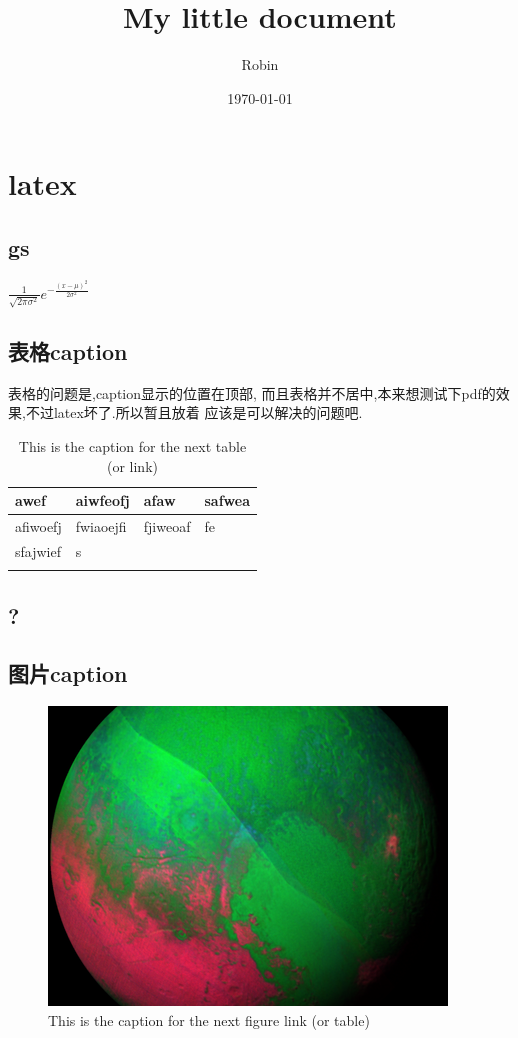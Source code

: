 \documentclass[nofonts]{ctexart}
\author{Robin}
\date{\today}
\title{My little document}
\begin{document}
\maketitle
\tableofcontents

\section{latex}
\label{sec:orgheadline10}
\subsection{gs}
\label{sec:orgheadline1}
\(\frac{1}{\sqrt{2\pi\sigma^2}}e^{ -\frac{(x-\mu)^2}{2\sigma^2} }\)
\subsection{表格caption}
\label{sec:orgheadline2}
    表格的问题是,caption显示的位置在顶部,
    而且表格并不居中,本来想测试下pdf的效果,不过latex坏了.所以暂且放着
应该是可以解决的问题吧.

\begin{table}[htb]
\caption{\label{tab:orgtable1}
This is the caption for the next table (or link)}
\centering
\begin{tabular}{llll}
awef & aiwfeofj & afaw & safwea\\
\hline
afiwoefj & fwiaoejfi & fjiweoaf & fe\\
sfajwief & s &  & \\
 &  &  & \\
\end{tabular}
\end{table}

\subsection{?}
\label{sec:orgheadline3}
\subsection{图片caption}
\label{sec:orgheadline4}

\begin{figure}[htb]
\centering
\includegraphics[width=.9\linewidth]{img/1.jpg}
\caption{\label{fig:orgparagraph1}
This is the caption for the next figure link (or table)}
\end{figure}
\end{document}
